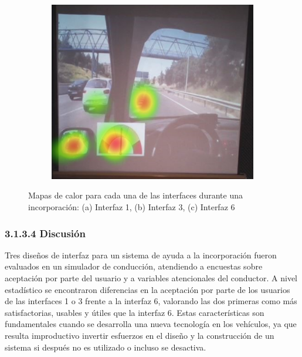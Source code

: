 \begin{figure}[h]
\begin{subfigure}[b]{0.4\textwidth}
    \caption{}
    \label{fig:3.12b}
  \end{subfigure}
  \begin{subfigure}[b]{0.4\textwidth}
    \includegraphics[width=\textwidth]{figures/3.12c.png}
    \caption{}
    \label{fig:3.12c}
  \end{subfigure}
  \caption{Mapas de calor para cada una de las interfaces durante una incorporación: (a) Interfaz 1, (b) Interfaz 3, (c) Interfaz 6}
  \label{fig:3.12}
\end{figure}

\subsubsection{3.1.3.4 Discusión}\label{3134}

Tres diseños de interfaz para un sistema de ayuda a la incorporación fueron evaluados en un simulador de conducción, atendiendo a encuestas sobre aceptación por parte del usuario y a variables atencionales del conductor. A nivel estadístico se encontraron diferencias en la aceptación por parte de los usuarios de las interfaces 1 o 3 frente a la interfaz 6, valorando las dos primeras como más satisfactorias, usables y útiles que la interfaz 6. Estas características son fundamentales cuando se desarrolla una nueva tecnología en los vehículos, ya que resulta improductivo invertir esfuerzos en el diseño y la construcción de un sistema si después no es utilizado o incluso se desactiva.

